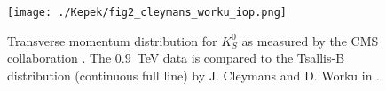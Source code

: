 \begin{figure}[h!t]
\centering
\texttt{[image: ./Kepek/fig2\_cleymans\_worku\_iop.png]}
\caption{Transverse momentum distribution for $K^0_S$ as measured by the CMS collaboration \cite{Khachatryan:2011tm}. The \mbox{$0.9$ TeV} data is compared to the Tsallis-B distribution (continuous full line) by J. Cleymans and D. Worku in \cite{Cleymans:2011in}. }
\label{fig:endistrCleymans}
\end{figure}